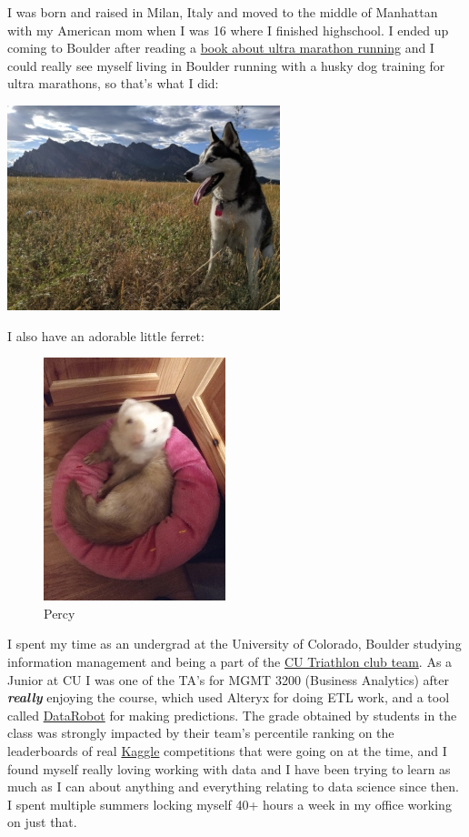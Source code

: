 \documentclass[
]{book}
\begin{document}
I was born and raised in Milan, Italy and moved to the middle of Manhattan with my American mom when I was 16 where I finished highschool. I ended up coming to Boulder after reading a \href{http://www.scottjurek.com/eat-run}{book about ultra marathon running} and I could really see myself living in Boulder running with a husky dog training for ultra marathons, so that's what I did:

\includegraphics{images/sakura.jpg}

I also have an adorable little ferret:

\begin{figure}
\centering
\includegraphics{images/percy_pic.jpg}
\caption{Percy}
\end{figure}

I spent my time as an undergrad at the University of Colorado, Boulder studying information management and being a part of the \href{https://www.cutriathlon.com/}{CU Triathlon club team}. As a Junior at CU I was one of the TA's for MGMT 3200 (Business Analytics) after \textbf{\emph{really}} enjoying the course, which used Alteryx for doing ETL work, and a tool called \href{https://www.datarobot.com/}{DataRobot} for making predictions. The grade obtained by students in the class was strongly impacted by their team's percentile ranking on the leaderboards of real \href{https://www.kaggle.com/}{Kaggle} competitions that were going on at the time, and I found myself really loving working with data and I have been trying to learn as much as I can about anything and everything relating to data science since then. I spent multiple summers locking myself 40+ hours a week in my office working on just that.
\end{document}
